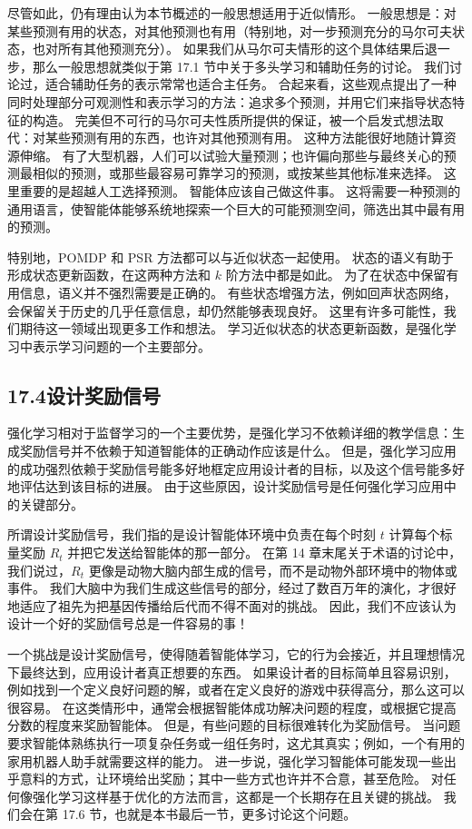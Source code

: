 \documentclass[UTF8,12pt,a4paper,fontset=fandol]{ctexart}
\begin{document}
尽管如此，仍有理由认为本节概述的一般思想适用于近似情形。
一般思想是：对某些预测有用的状态，对其他预测也有用（特别地，对一步预测充分的马尔可夫状态，也对所有其他预测充分）。
如果我们从马尔可夫情形的这个具体结果后退一步，那么一般思想就类似于第 17.1 节中关于多头学习和辅助任务的讨论。
我们讨论过，适合辅助任务的表示常常也适合主任务。
合起来看，这些观点提出了一种同时处理部分可观测性和表示学习的方法：追求多个预测，并用它们来指导状态特征的构造。
完美但不可行的马尔可夫性质所提供的保证，被一个启发式想法取代：对某些预测有用的东西，也许对其他预测有用。
这种方法能很好地随计算资源伸缩。
有了大型机器，人们可以试验大量预测；也许偏向那些与最终关心的预测最相似的预测，或那些最容易可靠学习的预测，或按某些其他标准来选择。
这里重要的是超越人工选择预测。
智能体应该自己做这件事。
这将需要一种预测的通用语言，使智能体能够系统地探索一个巨大的可能预测空间，筛选出其中最有用的预测。

特别地，POMDP 和 PSR 方法都可以与近似状态一起使用。
状态的语义有助于形成状态更新函数，在这两种方法和 $k$ 阶方法中都是如此。
为了在状态中保留有用信息，语义并不强烈需要是正确的。
有些状态增强方法，例如回声状态网络，会保留关于历史的几乎任意信息，却仍然能够表现良好。
这里有许多可能性，我们期待这一领域出现更多工作和想法。
学习近似状态的状态更新函数，是强化学习中表示学习问题的一个主要部分。

\subsection*{17.4\quad 设计奖励信号}

强化学习相对于监督学习的一个主要优势，是强化学习不依赖详细的教学信息：生成奖励信号并不依赖于知道智能体的正确动作应该是什么。
但是，强化学习应用的成功强烈依赖于奖励信号能多好地框定应用设计者的目标，以及这个信号能多好地评估达到该目标的进展。
由于这些原因，设计奖励信号是任何强化学习应用中的关键部分。

所谓设计奖励信号，我们指的是设计智能体环境中负责在每个时刻 $t$ 计算每个标量奖励 $R_t$ 并把它发送给智能体的那一部分。
在第 14 章末尾关于术语的讨论中，我们说过，$R_t$ 更像是动物大脑内部生成的信号，而不是动物外部环境中的物体或事件。
我们大脑中为我们生成这些信号的部分，经过了数百万年的演化，才很好地适应了祖先为把基因传播给后代而不得不面对的挑战。
因此，我们不应该认为设计一个好的奖励信号总是一件容易的事！

一个挑战是设计奖励信号，使得随着智能体学习，它的行为会接近，并且理想情况下最终达到，应用设计者真正想要的东西。
如果设计者的目标简单且容易识别，例如找到一个定义良好问题的解，或者在定义良好的游戏中获得高分，那么这可以很容易。
在这类情形中，通常会根据智能体成功解决问题的程度，或根据它提高分数的程度来奖励智能体。
但是，有些问题的目标很难转化为奖励信号。
当问题要求智能体熟练执行一项复杂任务或一组任务时，这尤其真实；例如，一个有用的家用机器人助手就需要这样的能力。
进一步说，强化学习智能体可能发现一些出乎意料的方式，让环境给出奖励；其中一些方式也许并不合意，甚至危险。
对任何像强化学习这样基于优化的方法而言，这都是一个长期存在且关键的挑战。
我们会在第 17.6 节，也就是本书最后一节，更多讨论这个问题。
\end{document}
